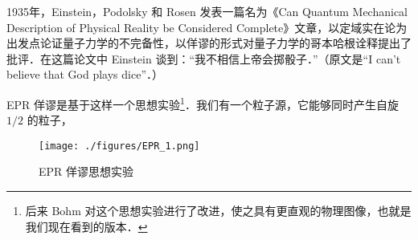 

1935年，Einstein，Podolsky 和 Rosen 发表一篇名为《Can Quantum Mechanical Description of Physical Reality be Considered Complete》文章，以定域实在论为出发点论证量子力学的不完备性，以佯谬的形式对量子力学的哥本哈根诠释提出了批评．在这篇论文中 Einstein 谈到：“我不相信上帝会掷骰子．”（原文是“I can't believe that God plays dice”．） 

EPR 佯谬是基于这样一个思想实验\footnote{后来 Bohm 对这个思想实验进行了改进，使之具有更直观的物理图像，也就是我们现在看到的版本．}．我们有一个粒子源，它能够同时产生自旋 $1/2$ 的粒子，
\begin{figure}[ht]
\centering
\texttt{[image: ./figures/EPR\_1.png]}
\caption{EPR 佯谬思想实验} \label{EPR_fig1}
\end{figure}
